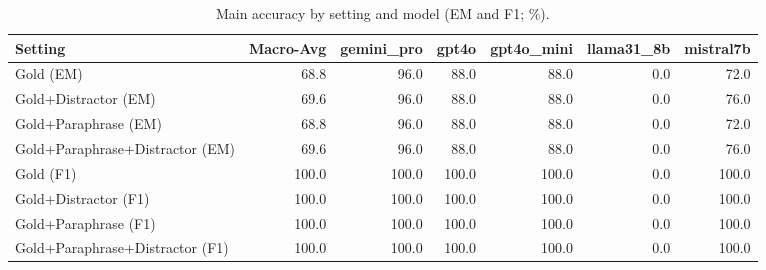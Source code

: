 \begin{table}[t]\centering
\caption{Main accuracy by setting and model (EM and F1; \%).}
\label{tab:main-accuracy}
\begin{tabular}{lrrrrrr}
\toprule
Setting & Macro-Avg & gemini_pro & gpt4o & gpt4o_mini & llama31_8b & mistral7b \\
\midrule
Gold (EM) & 68.8 & 96.0 & 88.0 & 88.0 & 0.0 & 72.0 \\
Gold+Distractor (EM) & 69.6 & 96.0 & 88.0 & 88.0 & 0.0 & 76.0 \\
Gold+Paraphrase (EM) & 68.8 & 96.0 & 88.0 & 88.0 & 0.0 & 72.0 \\
Gold+Paraphrase+Distractor (EM) & 69.6 & 96.0 & 88.0 & 88.0 & 0.0 & 76.0 \\
Gold (F1) & 100.0 & 100.0 & 100.0 & 100.0 & 0.0 & 100.0 \\
Gold+Distractor (F1) & 100.0 & 100.0 & 100.0 & 100.0 & 0.0 & 100.0 \\
Gold+Paraphrase (F1) & 100.0 & 100.0 & 100.0 & 100.0 & 0.0 & 100.0 \\
Gold+Paraphrase+Distractor (F1) & 100.0 & 100.0 & 100.0 & 100.0 & 0.0 & 100.0 \\
\bottomrule
\end{tabular}
\end{table}
